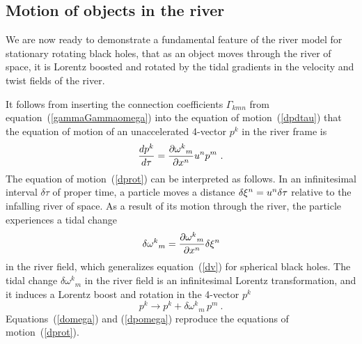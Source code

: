\documentclass[twocolumn,showpacs,preprintnumbers,amsmath,amssymb,prb]{revtex4}
\begin{document}
\subsection{Motion of objects in the river}
\label{motion}

We are now ready to demonstrate a fundamental feature of the river model
for stationary rotating black holes,
that as an object moves through the river of space,
it is Lorentz boosted and rotated
by the tidal gradients in the velocity and twist fields of the river.

It follows from inserting the connection coefficients $\Gamma_{kmn}$
from equation~(\ref{gammaGammaomega}) into the equation of motion~(\ref{dpdtau})
that the equation of motion of an unaccelerated 4-vector $p^k$
in the river frame is
\begin{equation}
\label{dprot}
  {dp^k \over d\tau}
  =
  {\partial {\omega^k}_m \over \partial x^n} u^n p^m
  \ .
\end{equation}
The equation of motion~(\ref{dprot})
can be interpreted as follows.
In an infinitesimal interval $\delta \tau$ of proper time,
a particle moves a distance
$\delta \xi^n = u^n \delta \tau$
relative to the infalling river of space.
As a result of its motion through the river,
the particle experiences a tidal change
\begin{equation}
\label{domega}
  \delta {\omega^k}_m = {\partial {\omega^k}_m \over \partial x^n} \delta \xi^n
\end{equation}
in the river field,
which generalizes equation~(\ref{dv}) for spherical black holes.
The tidal change $\delta {\omega^k}_m$ in the river field
is an infinitesimal Lorentz transformation,
and it induces a Lorentz boost and rotation in the 4-vector $p^k$
\begin{equation}
\label{dpomega}
  p^k \rightarrow p^k + \delta {\omega^k}_m \, p^m
  \ .
\end{equation}
Equations~(\ref{domega}) and (\ref{dpomega})
reproduce the equations of motion~(\ref{dprot}).

\geodesicsfig
\end{document}
